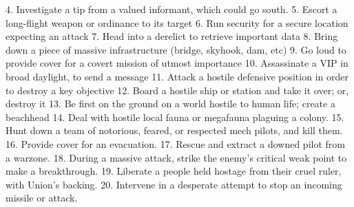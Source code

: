                                                                                                           


    4.  Investigate a tip from a valued informant, which could go south.   
    5.  Escort a long-flight weapon or ordinance to its target   
    6.  Run security for a secure location expecting an attack   
    7.  Head into a derelict to retrieve important data    
    8.  Bring down a piece of massive infrastructure (bridge, skyhook, dam, etc)  
    9.  Go loud to provide cover for a covert mission of utmost importance  
    10. Assassinate a VIP in broad daylight, to send a message  
    11. Attack a hostile defensive position in order to destroy a key objective  
    12. Board a hostile ship or station and take it over; or, destroy it   
    13. Be first on the ground on a world hostile to human life; create a beachhead  
    14. Deal with hostile local fauna or megafauna plaguing a colony.   
    15. Hunt down a team of notorious, feared, or respected mech pilots, and kill them.   
    16. Provide cover for an evacuation.  
    17. Rescue and extract a downed pilot from a warzone.   
    18. During a massive attack, strike the enemy’s critical weak point to make a breakthrough.  
    19. Liberate a people held hostage from their cruel ruler, with Union’s backing.  
    20. Intervene in a desperate attempt to stop an incoming missile or attack.   

